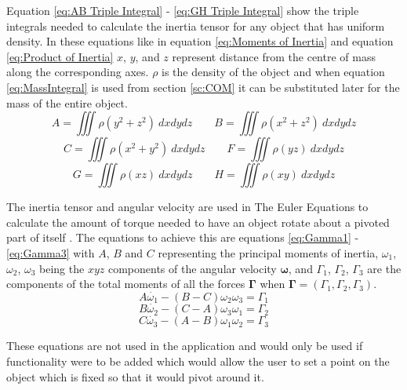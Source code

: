 Equation \ref{eq:AB Triple Integral} - \ref{eq:GH Triple Integral} show the triple integrals needed to calculate the inertia tensor for any object that has uniform density.
In these equations like in equation \ref{eq:Moments of Inertia} and equation \ref{eq:Product of Inertia} $x$, $y$, and $z$ represent distance from the centre of mass along the corresponding axes.
$\rho$ is the density of the object and when equation \ref{eq:MassIntegral} is used from section \ref{sc:COM} it can be substituted later for the mass of the entire object.
\begin{equation}\label{eq:AB Triple Integral}
	A=\iiint \rho({y}^{2}+{z}^{2})\  dx dy dz
	\qquad
	B=\iiint \rho({x}^{2}+{z}^{2})\ dx dy dz
\end{equation}
\begin{equation}\label{eq:CF Triple Integral}
	C=\iiint \rho({x}^{2}+{y}^{2})\ dx dy dz
	\qquad
	F=\iiint \rho(yz)\ dx dy dz
\end{equation}
\begin{equation}\label{eq:GH Triple Integral}
	G=\iiint \rho(xz)\ dx dy dz
	\qquad
	H=\iiint \rho(xy)\ dx dy dz
\end{equation}

The inertia tensor and angular velocity are used in The Euler Equations to calculate the amount of torque needed to have an object rotate about a pivoted part of itself \citep{mactaggart2013l8}.
The equations to achieve this are equations \ref{eq:Gamma1} - \ref{eq:Gamma3} with $A$, $B$ and $C$ representing the principal moments of inertia, $\omega_{1}$, $\omega_{2}$, $\omega_{3}$ being the $xyz$ components of the angular velocity $\boldsymbol\omega$, and $\Gamma_{1}$, $\Gamma_{2}$, $\Gamma_{3}$ are the components of the total moments of all the forces $\mathbf{\Gamma}$ when $\mathbf{\Gamma} = (\Gamma_{1}, \Gamma_{2}, \Gamma_{3})$.
\begin{equation}\label{eq:Gamma1}
	A\dot{\omega_{1}} - (B-C)\omega_{2}\omega_{3} = \Gamma_{1}
\end{equation}
\begin{equation}\label{eq:Gamma2}
	B\dot{\omega_{2}} - (C-A)\omega_{3}\omega_{1} = \Gamma_{2}
\end{equation}
\begin{equation}\label{eq:Gamma3}
	C\dot{\omega_{3}} - (A-B)\omega_{1}\omega_{2} = \Gamma_{3}
\end{equation}

These equations are not used in the application and would only be used if functionality were to be added which would allow the user to set a point on the object which is fixed so that it would pivot around it.